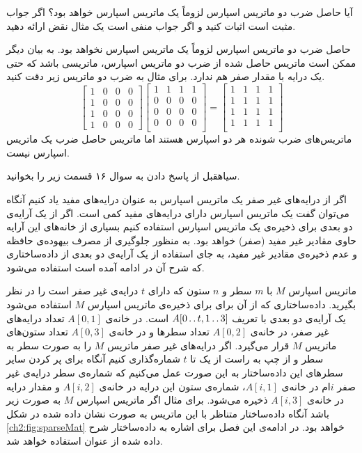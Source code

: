 
 آیا حاصل ضرب دو ماتریس اسپارس لزوماً یک ماتریس اسپارس خواهد بود؟ اگر جواب مثبت است اثبات کنید و اگر جواب منفی است یک مثال نقض ارائه دهید.


حاصل ضرب دو ماتریس اسپارس لزوماً یک ماتریس اسپارس نخواهد بود. به بیان دیگر ممکن است ماتریس حاصل شده از ضرب دو ماتریس اسپارس، ماتریسی باشد که حتی یک درایه با مقدار صفر هم ندارد. برای مثال به ضرب دو ماتریس زیر دقت کنید.
$$
\begin{bmatrix}
1 & 0 & 0 & 0\\
1 & 0 & 0 & 0\\
1 & 0 & 0 & 0\\
1 & 0 & 0 & 0
\end{bmatrix}
\begin{bmatrix}
1 & 1 & 1 & 1\\
0 & 0 & 0 & 0\\
0 & 0 & 0 & 0\\
0 & 0 & 0 & 0\\
\end{bmatrix}
=
\begin{bmatrix}
1 & 1 & 1 & 1\\
1 & 1 & 1 & 1\\
1 & 1 & 1 & 1\\
1 & 1 & 1 & 1\\
\end{bmatrix}
$$
ماتریس‌های ضرب شونده هر دو اسپارس هستند اما ماتریس حاصل ضرب یک ماتریس اسپارس نیست.


‌سیاه{قبل از پاسخ دادن به سوال ۱۶ قسمت زیر را بخوانید.}

اگر از درایه‌های غیر صفر یک ماتریس اسپارس به عنوان درایه‌های مفید یاد کنیم آنگاه می‌توان گفت یک ماتریس اسپارس دارای درایه‌های مفید کمی است. اگر از یک آرایه‌ی دو بعدی برای ذخیره‌ی یک ماتریس اسپارس استفاده کنیم بسیاری از خانه‌های این آرایه حاوی مقادیر غیر مفید (صفر) خواهد بود. به منظور جلوگیری از مصرف بیهوده‌ی حافظه و عدم ذخیره‌ی مقادیر غیر مفید، به جای استفاده از یک آرایه‌ی دو بعدی از داده‌ساختاری که شرح آن در ادامه آمده است استفاده می‌شود.

ماتریس اسپارس {$M$} با {$m$} سطر و {$n$} ستون که دارای {$t$} درایه‌ی غیر صفر است را در نظر بگیرید. داده‌ساختاری که از آن برای برای ذخیره‌ی ماتریس اسپارس {$M$} استفاده می‌شود یک آرایه‌ی دو بعدی با تعریف {$A[0\mathinner{\ldotp\ldotp} t,1\mathinner{\ldotp\ldotp} 3]$} است. در خانه‌ی {$A[0,1]$} تعداد درایه‌های غیر صفر، در خانه‌ی {$A[0,2]$} تعداد سطرها و در خانه‌ی {$A[0,3]$} تعداد ستون‌های ماتریس {$M$} قرار می‌گیرد. اگر درایه‌های غیر صفر ماتریس {$M$} را به صورت سطر به سطر و از چپ به راست از یک تا {$t$} شماره‌گذاری کنیم آنگاه برای پر کردن سایر سطرهای این داده‌ساختار به این صورت عمل می‌کنیم که شماره‌ی سطر درایه‌ی غیر صفر {$i$}ام در خانه‌ی {$A[i,1]$}، شماره‌ی ستون این درایه در خانه‌ی {$A[i,2]$} و مقدار درایه در خانه‌ی {$A[i,3]$} ذخیره می‌شود. برای مثال اگر ماتریس اسپارس {$M$} به صورت زیر باشد آنگاه داده‌ساختار متناظر با این ماتریس به صورت نشان داده شده در شکل {\eqref{ch2:fig:sparseMat}} خواهد بود. در ادامه‌ی این فصل برای اشاره به داده‌ساختار شرح داده شده از عنوان {} استفاده خواهد شد.

